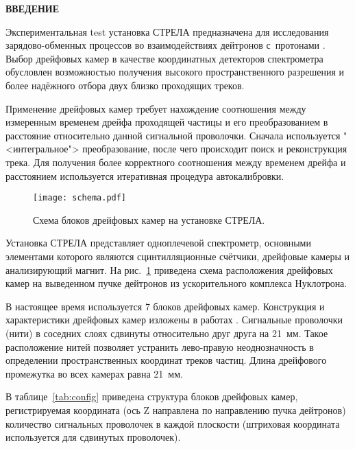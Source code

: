 
\vspace* {2.5cm}
\begin{center} \bf{ВВЕДЕНИЕ} \end{center}

Экспериментальная test установка СТРЕЛА предназначена для исследования
зарядово-обменных процессов во взаимодействиях дейтронов с~протонами
\cite{cejp:2008}. Выбор дрейфовых камер в качестве координатных детекторов
спектрометра обусловлен возможностью получения высокого пространственного
разрешения и более надёжного отбора двух близко проходящих треков.

Применение дрейфовых камер требует нахождение соотношения между измеренным
временем дрейфа проходящей частицы и его преобразованием в расстояние
относительно данной сигнальной проволочки. Сначала используется
"<интегральное"> преобразование, после чего происходит поиск и реконструкция
трека. Для получения более корректного соотношения между временем дрейфа
и расстоянием используется итеративная процедура автокалибровки.

\begin{figure}[h]
  \begin{center}
    \texttt{[image: schema.pdf]}
    \caption {Схема блоков дрейфовых камер на установке СТРЕЛА.}
    \label{fig:schema}
  \end{center}
\end{figure}

Установка СТРЕЛА \cite{strela:web} представляет одноплечевой спектрометр,
основными элементами которого являются сцинтилляционные счётчики, дрейфовые
камеры и анализирующий магнит. На рис.~\ref{fig:schema} приведена схема
расположения дрейфовых камер на выведенном пучке дейтронов из ускорительного
комплекса Нуклотрона.

В настоящее время используется 7 блоков дрейфовых камер. Конструкция и
характеристики дрейфовых камер изложены в работах \cite{filatova:1977,
  vodopianov:1975, vodopianov:1983}. Сигнальные проволочки (нити) в соседних
слоях сдвинуты относительно друг друга на 21~мм. Такое расположение нитей
позволяет устранить лево-правую неоднозначность в определении пространственных
координат треков частиц. Длина дрейфового промежутка во всех камерах равна
21~мм.

В таблице~\ref{tab:config} приведена структура блоков дрейфовых камер,
регистрируемая координата (ось Z направлена по направлению пучка дейтронов)
количество сигнальных проволочек в каждой плоскости (штриховая координата
используется для сдвинутых проволочек).

